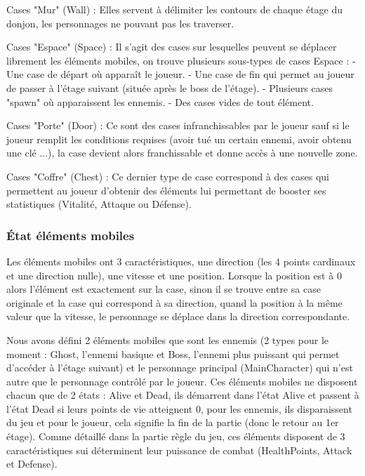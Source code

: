\documentclass[a4paper,12pt]{article}
\begin{document}
Cases "Mur" (Wall) : Elles servent à délimiter les contours de chaque étage du donjon, les personnages ne pouvant pas les traverser.

Cases "Espace" (Space) : Il s'agit des cases sur lesquelles peuvent se déplacer librement les éléments mobiles, on trouve plusieurs sous-types de cases Espace :
- Une case de départ où apparaît le joueur.
- Une case de fin qui permet au joueur de passer à l'étage suivant (située après le boss de l'étage).
- Plusieurs cases "spawn" où apparaissent les ennemis.
- Des cases vides de tout élément.

Cases "Porte" (Door) : Ce sont des cases infranchissables par le joueur sauf si le joueur remplit les conditions requises (avoir tué un certain ennemi, avoir obtenu une clé ...), la case devient alors franchissable et donne accès à une nouvelle zone.

Cases "Coffre" (Chest) : Ce dernier type de case correspond à des cases qui permettent au joueur d'obtenir des éléments lui permettant de booster ses statistiques (Vitalité, Attaque ou Défense).

\subsubsection{État éléments mobiles}

Les éléments mobiles ont 3 caractéristiques, une direction (les 4 points cardinaux et une direction nulle), une vitesse et une position.
Lorsque la position est à 0 alors l'élément est exactement sur la case, sinon il se trouve entre sa case originale et la case qui correspond à sa direction, quand la position à la même valeur que la vitesse, le personnage se déplace dans la direction correspondante.

Nous avons défini 2 éléments mobiles que sont les ennemis (2 types pour le moment : Ghost, l'ennemi basique et Boss, l'ennemi plus puissant qui permet d'accéder à l'étage suivant) et le personnage principal (MainCharacter) qui n'est autre que le personnage contrôlé par le joueur.
Ces éléments mobiles ne disposent chacun que de 2 états : Alive et Dead, ils démarrent dans l'état Alive et passent à l'état Dead si leurs points de vie atteignent 0, pour les ennemis, ils disparaissent du jeu et pour le joueur, cela signifie la fin de la partie (donc le retour au 1er étage).
Comme détaillé dans la partie règle du jeu, ces éléments disposent de 3 caractéristiques sui déterminent leur puissance de combat (HealthPoints, Attack et Defense).
\end{document}
